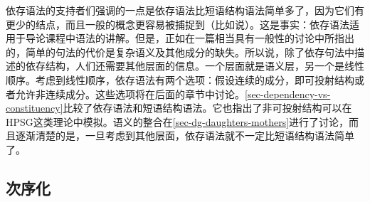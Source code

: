 依存语法的支持者们强调的一点是依存语法比短语结构语法简单多了，因为它们有更少的结点，而且一般的概念更容易被捕捉到（比如说\citealp[\S~3.2, \S~7]{Osborne2014a-u}）。这是事实：依存语法适用于导论课程中语法的讲解。但是，正如\citet[]{SR2012a}在一篇相当具有一般性的讨论中所指出的，简单的句法的代价是复杂语义及其他成分的缺失。所以说，除了依存句法中描述的依存结构，人们还需要其他层面的信息。一个层面就是语义层，另一个是线性顺序。考虑到线性顺序，依存语法有两个选项：假设连续的成分，即可投射结构或者允许非连续成分。这些选项将在后面的章节中讨论。\ref{sec-dependency-vs-constituency}比较了依存语法和短语结构语法。它也指出了非可投射结构可以在HPSG这类理论中模拟。语义的整合在\ref{sec-dg-daughters-mothers}进行了讨论，而且逐渐清楚的是，一旦考虑到其他层面，依存语法就不一定比短语结构语法简单了。

\subsection{次序化}
\label{sec-linearization-problems-dg}
\label{sec-dg-multiple-frontings}


